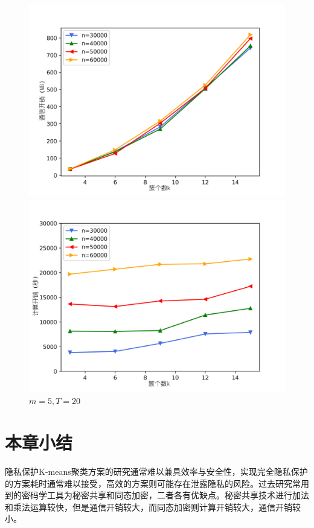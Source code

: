 \begin{figure}[htbp]
	\begin{minipage}[t]{0.5\linewidth}
		\includegraphics[width=\linewidth]{img/k.png}
		
	\end{minipage}%
	\hfill%
	\begin{minipage}[t]{0.5\linewidth}
		\includegraphics[width=\linewidth]{img/k_comm.png}
		
	\end{minipage}
	\caption{$m=5, T=20$}
	\label{f7}
\end{figure}
\section{本章小结}
\label{s3-xiaojie}
隐私保护K-means聚类方案的研究通常难以兼具效率与安全性，实现完全隐私保护的方案耗时通常难以接受\cite{jaschke2019unsupervised}，高效的方案则可能存在泄露隐私的风险\cite{wu2020secure}。过去研究常用到的密码学工具为秘密共享\cite{mohassel2019practical}和同态加密\cite{jaschke2019unsupervised}\cite{wu2020secure}，二者各有优缺点。秘密共享技术进行加法和乘法运算较快，但是通信开销较大，而同态加密则计算开销较大，通信开销较小。

